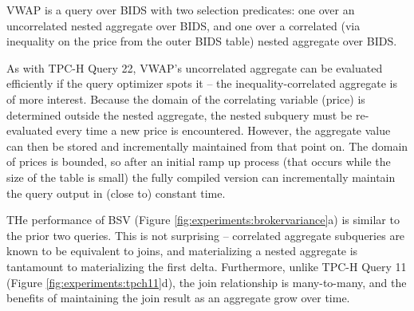 VWAP is a query over BIDS with two selection predicates: one over an uncorrelated nested aggregate over BIDS, and one over a correlated (via inequality on the price from the outer BIDS table) nested aggregate over BIDS.  

As with TPC-H Query 22, VWAP's uncorrelated aggregate can be evaluated efficiently if the query optimizer spots it -- the inequality-correlated aggregate is of more interest.  Because the domain of the correlating variable (price) is determined outside the nested aggregate, the nested subquery must be re-evaluated every time a new price is encountered.  However, the aggregate value can then be stored and incrementally maintained from that point on.  The domain of prices is bounded, so after an initial ramp up process (that occurs while the size of the table is small) the fully compiled version can incrementally maintain the query output in (close to) constant time.

THe performance of BSV (Figure \ref{fig:experiments:brokervariance}a) is similar to the prior two queries.  This is not surprising -- correlated aggregate subqueries are known to be equivalent to joins, and materializing a nested aggregate is tantamount to materializing the first delta.  Furthermore, unlike TPC-H Query 11 (Figure \ref{fig:experiments:tpch11}d), the join relationship is many-to-many, and the benefits of maintaining the join result as an aggregate grow over time.

